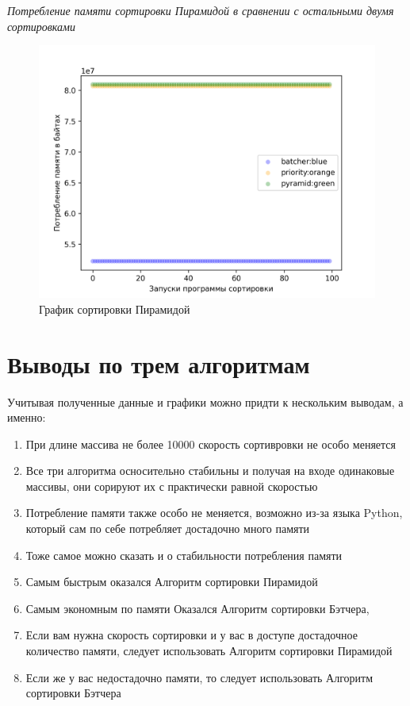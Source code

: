 \textit{Потребление памяти сортировки Пирамидой в сравнении с остальными двумя сортировками}

\begin{figure}[H]
    \centering
    \includegraphics[width=1\textwidth]{./plots/bitonic_memory.png}
    \caption{График сортировки Пирамидой}
\end{figure}










\section{Выводы по трем алгоритмам}



Учитывая полученные данные и графики можно придти к нескольким выводам, а именно:

\begin{enumerate}
    \item При длине массива не более 10000 скорость сортивровки не особо меняется
    \item Все три алгоритма осносительно стабильны и получая на входе одинаковые массивы, они сорируют их с практически равной скоростью
    \item Потребление памяти также особо не меняется, возможно из-за языка Python, который сам по себе потребляет достадочно много памяти
    \item Тоже самое можно сказать и о стабильности потребления памяти
    \item Самым быстрым оказался Алгоритм сортировки Пирамидой
    \item Самым экономным по памяти Оказался Алгоритм сортировки Бэтчера,
    \item Если вам нужна скорость сортировки и у вас в доступе достадочное количество памяти, следует использовать Алгоритм сортировки Пирамидой
    \item Если же у вас недостадочно памяти, то следует использовать Алгоритм сортировки Бэтчера
\end{enumerate}










